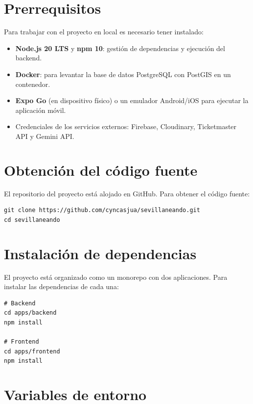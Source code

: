 \section{Prerrequisitos}

Para trabajar con el proyecto en local es necesario tener instalado:

\begin{itemize}
    \item \textbf{Node.js 20 LTS} y \textbf{npm 10}: gestión de dependencias y ejecución del backend.
    \item \textbf{Docker}: para levantar la base de datos PostgreSQL con PostGIS en un contenedor.
    \item \textbf{Expo Go} (en dispositivo físico) o un emulador Android/iOS para ejecutar la aplicación móvil.
    \item Credenciales de los servicios externos: Firebase, Cloudinary, Ticketmaster API y Gemini API.
\end{itemize}

\section{Obtención del código fuente}

El repositorio del proyecto está alojado en GitHub. Para obtener el código fuente:

\begin{lstlisting}
git clone https://github.com/cyncasjua/sevillaneando.git
cd sevillaneando
\end{lstlisting}

\section{Instalación de dependencias}

El proyecto está organizado como un monorepo con dos aplicaciones. Para instalar las dependencias de cada una:

\begin{lstlisting}
# Backend
cd apps/backend
npm install

# Frontend
cd apps/frontend
npm install
\end{lstlisting}

\section{Variables de entorno}

